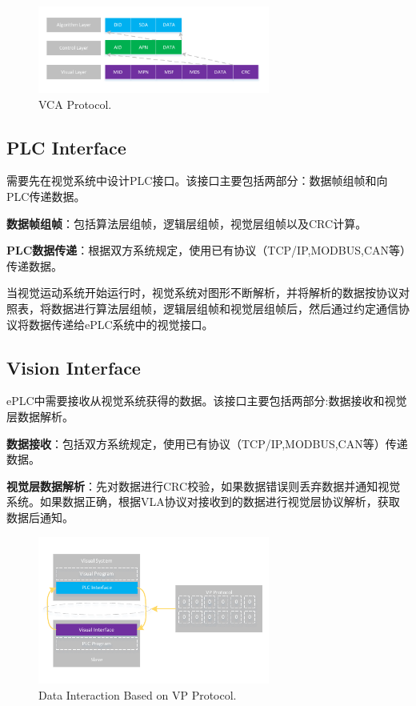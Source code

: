 \documentclass[journal,UTF8]{IEEEtran}
\begin{document}
\begin{figure}
	\centering
	\includegraphics[width=3in]{fig/Protocol.pdf}
	\caption{ VCA Protocol.}
	\label{fig:Protocol}
\end{figure}
\subsection{PLC Interface}
需要先在视觉系统中设计PLC接口。该接口主要包括两部分：数据帧组帧和向PLC传递数据。

\textbf{数据帧组帧}：包括算法层组帧，逻辑层组帧，视觉层组帧以及CRC计算。

\textbf{PLC数据传递}：根据双方系统规定，使用已有协议（TCP/IP,MODBUS,CAN等）传递数据。

当视觉运动系统开始运行时，视觉系统对图形不断解析，并将解析的数据按协议对照表，将数据进行算法层组帧，逻辑层组帧和视觉层组帧后，然后通过约定通信协议将数据传递给ePLC系统中的视觉接口。
\subsection{Vision Interface}
ePLC中需要接收从视觉系统获得的数据。该接口主要包括两部分:数据接收和视觉层数据解析。

\textbf{数据接收}：包括双方系统规定，使用已有协议（TCP/IP,MODBUS,CAN等）传递数据。

\textbf{视觉层数据解析}：先对数据进行CRC校验，如果数据错误则丢弃数据并通知视觉系统。如果数据正确，根据VLA协议对接收到的数据进行视觉层协议解析，获取数据后通知。
\begin{figure}
	\centering
	\includegraphics[width=3in]{fig/FlexibleLayer.pdf}
	\caption{ Data Interaction Based on VP Protocol.}
	\label{fig:FlexibleLayer}
\end{figure}
\end{document}
